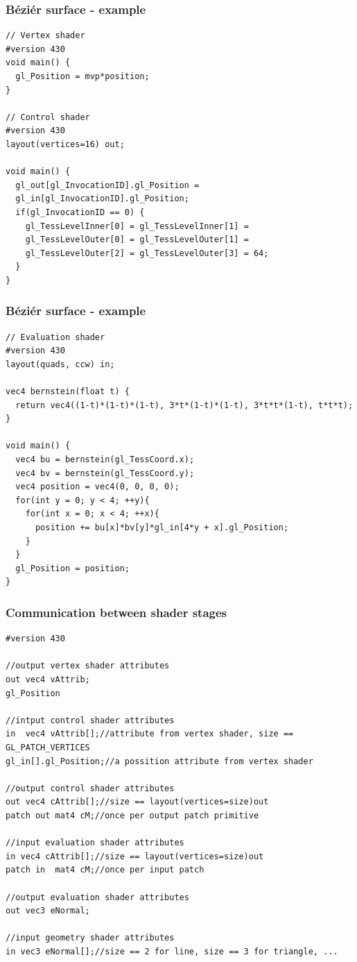 \begin{frame}[fragile]
  \frametitle{Béziér surface - example}
	{\scriptsize
	\begin{verbatim}
// Vertex shader	
#version 430
void main() {
  gl_Position = mvp*position;
}

// Control shader
#version 430
layout(vertices=16) out;

void main() {
  gl_out[gl_InvocationID].gl_Position =
  gl_in[gl_InvocationID].gl_Position;
  if(gl_InvocationID == 0) {
    gl_TessLevelInner[0] = gl_TessLevelInner[1] = 
    gl_TessLevelOuter[0] = gl_TessLevelOuter[1] =
    gl_TessLevelOuter[2] = gl_TessLevelOuter[3] = 64;
  }
}
\end{verbatim}
	}
\end{frame}

\begin{frame}[fragile]
    \frametitle{Béziér surface - example}
  	{\scriptsize
		\begin{verbatim}
// Evaluation shader
#version 430
layout(quads, ccw) in;

vec4 bernstein(float t) {
  return vec4((1-t)*(1-t)*(1-t), 3*t*(1-t)*(1-t), 3*t*t*(1-t), t*t*t);
}

void main() {
  vec4 bu = bernstein(gl_TessCoord.x);
  vec4 bv = bernstein(gl_TessCoord.y);
  vec4 position = vec4(0, 0, 0, 0);
  for(int y = 0; y < 4; ++y){
    for(int x = 0; x < 4; ++x){
      position += bu[x]*bv[y]*gl_in[4*y + x].gl_Position;
    }
  }
  gl_Position = position;
}
  	\end{verbatim}
		}
\end{frame}

\begin{frame}[fragile]
\frametitle{Communication between shader stages}
	{\tiny
	\begin{verbatim}
#version 430

//output vertex shader attributes
out vec4 vAttrib;
gl_Position

//intput control shader attributes
in  vec4 vAttrib[];//attribute from vertex shader, size == GL_PATCH_VERTICES
gl_in[].gl_Position;//a possition attribute from vertex shader

//output control shader attributes
out vec4 cAttrib[];//size == layout(vertices=size)out
patch out mat4 cM;//once per output patch primitive

//input evaluation shader attributes
in vec4 cAttrib[];//size == layout(vertices=size)out
patch in  mat4 cM;//once per input patch

//output evaluation shader attributes
out vec3 eNormal;

//input geometry shader attributes
in vec3 eNormal[];//size == 2 for line, size == 3 for triangle, ...
	\end{verbatim}
	}
\end{frame}

